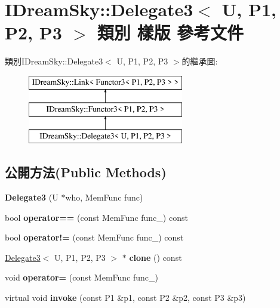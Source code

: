 \hypertarget{class_i_dream_sky_1_1_delegate3}{}\section{I\+Dream\+Sky\+:\+:Delegate3$<$ U, P1, P2, P3 $>$ 類別 樣版 參考文件}
\label{class_i_dream_sky_1_1_delegate3}
類別\+I\+Dream\+Sky\+:\+:Delegate3$<$ U, P1, P2, P3 $>$的繼承圖\+:\begin{figure}[H]
\begin{center}
\leavevmode
\includegraphics[height=3.000000cm]{class_i_dream_sky_1_1_delegate3}
\end{center}
\end{figure}
\subsection*{公開方法(Public Methods)}
\begin{DoxyCompactItemize}
\item 
{\bfseries Delegate3} (U $\ast$who, Mem\+Func func)\hypertarget{class_i_dream_sky_1_1_delegate3_a8863e194bd351444ec504626fe066590}{}\label{class_i_dream_sky_1_1_delegate3_a8863e194bd351444ec504626fe066590}

\item 
bool {\bfseries operator==} (const Mem\+Func func\+\_\+) const \hypertarget{class_i_dream_sky_1_1_delegate3_a3cbb2958905dc54a96c5b190c310069b}{}\label{class_i_dream_sky_1_1_delegate3_a3cbb2958905dc54a96c5b190c310069b}

\item 
bool {\bfseries operator!=} (const Mem\+Func func\+\_\+) const \hypertarget{class_i_dream_sky_1_1_delegate3_a531a9f15013d7483ff9e9618ef92f9ce}{}\label{class_i_dream_sky_1_1_delegate3_a531a9f15013d7483ff9e9618ef92f9ce}

\item 
\hyperlink{class_i_dream_sky_1_1_delegate3}{Delegate3}$<$ U, P1, P2, P3 $>$ $\ast$ {\bfseries clone} () const \hypertarget{class_i_dream_sky_1_1_delegate3_aac2d56a5ec7a691eafbacdbcc41e01ea}{}\label{class_i_dream_sky_1_1_delegate3_aac2d56a5ec7a691eafbacdbcc41e01ea}

\item 
void {\bfseries operator=} (const Mem\+Func func\+\_\+)\hypertarget{class_i_dream_sky_1_1_delegate3_a4f674e8df772462b4efaebd689ea06af}{}\label{class_i_dream_sky_1_1_delegate3_a4f674e8df772462b4efaebd689ea06af}

\item 
virtual void {\bfseries invoke} (const P1 \&p1, const P2 \&p2, const P3 \&p3)\hypertarget{class_i_dream_sky_1_1_delegate3_aa27972da822f881d4ced13bf812cf04e}{}\label{class_i_dream_sky_1_1_delegate3_aa27972da822f881d4ced13bf812cf04e}

\end{DoxyCompactItemize}



